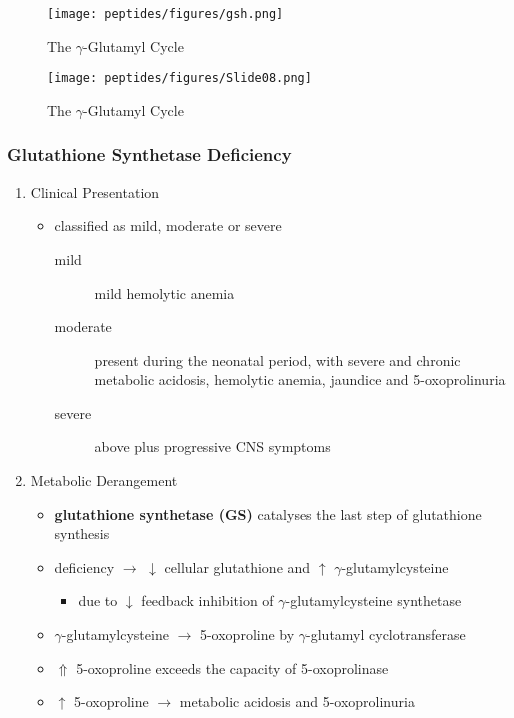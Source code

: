 \documentclass[12pt]{scrartcl}
\begin{document}
\begin{figure}[htbp]
\centering
\texttt{[image: peptides/figures/gsh.png]}
\caption{\label{fig:org5a2a768}The \(\gamma\)-Glutamyl Cycle}
\end{figure}


\begin{figure}[htbp]
\centering
\texttt{[image: peptides/figures/Slide08.png]}
\caption{\label{fig:org4a75f46}The \(\gamma\)-Glutamyl Cycle}
\end{figure}


\subsubsection{Glutathione Synthetase Deficiency}
\label{sec:org62a6ae8}
\begin{enumerate}
\item Clinical Presentation
\label{sec:orgc97eb90}
\begin{itemize}
\item classified as mild, moderate or severe
\begin{description}
\item[{mild}] mild hemolytic anemia
\item[{moderate}] present during the neonatal period, with severe and
chronic metabolic acidosis, hemolytic anemia, jaundice
and 5-oxoprolinuria
\item[{severe}] above plus progressive CNS symptoms
\end{description}
\end{itemize}

\item Metabolic Derangement
\label{sec:orgc60ec04}
\begin{itemize}
\item \textbf{glutathione synthetase (GS)} catalyses the last step of glutathione synthesis
\item deficiency \(\to\) \(\downarrow\) cellular glutathione and \(\uparrow\) \(\gamma\)-glutamylcysteine
\begin{itemize}
\item due to \(\downarrow\) feedback inhibition of \(\gamma\)-glutamylcysteine synthetase
\end{itemize}
\item \(\gamma\)-glutamylcysteine \(\to\) 5-oxoproline by \(\gamma\)-glutamyl
cyclotransferase
\item \(\Uparrow\) 5-oxoproline exceeds the capacity of 5-oxoprolinase
\item \(\uparrow\) 5-oxoproline \(\to\) metabolic acidosis and 5-oxoprolinuria
\end{itemize}


\end{enumerate}
\end{document}
